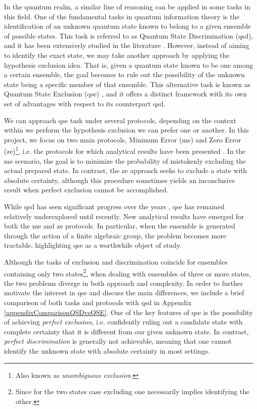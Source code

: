 \documentclass[12pt,letterpaper]{article}
\begin{document}
In the quantum realm, a similar line of reasoning can be applied in some tasks in this field. One of the fundamental tasks in quantum information theory is the identification of an unknown quantum state known to belong to a given ensemble of possible states. This task is referred to as Quantum State Discrimination (\gls{qsd}), and it has been extensively studied in the literature \cite{DiscriminationArticle}. However, instead of aiming to identify the exact state, we may take another approach by applying the hypothesis exclusion idea. That is, given a quantum state known to be one among a certain ensemble, the goal becomes to rule out the possibility of the unknown state being a specific member of that ensemble. This alternative task is known as Quantum State Exclusion (\gls{qse}) \cite{PhysicsExclusionSource}, and it offers a distinct framework with its own set of advantages \cite{piani2020quantum} with respect to its counterpart \gls{qsd}.

We can approach \gls{qse} task under several protocols, depending on the context within we perform the hypothesis exclusion we can prefer one or another. In this project, we focus on two main protocols, Minimum Error (\gls{me}) and Zero Error (\gls{ze})\footnote{Also known as \emph{unambiguous exclusion}.}, i.e. the protocols for which analytical results have been presented \cite{MainPaper}. In the \gls{me} scenario, the goal is to minimize the probability of mistakenly excluding the actual prepared state. In contrast, the \gls{ze} approach seeks to exclude a state with absolute certainty, although this procedure sometimes yields an inconclusive result when perfect exclusion cannot be accomplished.

While \gls{qsd} has seen significant progress over the years \cite{bae2015quantum, helstromBook}, \gls{qse} has remained relatively underexplored until recently. New analytical results have emerged \cite{MainPaper} for both the \gls{me} and \gls{ze} protocols. In particular, when the ensemble is generated through the action of a finite algebraic group, the problem becomes more tractable, highlighting \gls{qse} as a worthwhile object of study.

Although the tasks of exclusion and discrimination coincide for ensembles containing only two states\footnote{Since for the two states case excluding one necessarily implies identifying the other.}, when dealing with ensembles of three or more states, the two problems diverge in both approach and complexity. In order to further motivate the interest in \gls{qse} and discuss the main differences, we include a brief comparison of both tasks and protocols  with \gls{qsd} in Appendix \ref{appendixComparisonQSDvsQSE}. One of the key features of \gls{qse} is the possibility of achieving \emph{perfect exclusion}, i.e. confidently ruling out a candidate state with complete certainty that it is different from our given unknown state. In contrast, \emph{perfect discrimination} is generally not achievable, meaning that one cannot identify the unknown state with absolute certainty in most settings\cite{OptimalitySRM}.
\end{document}
